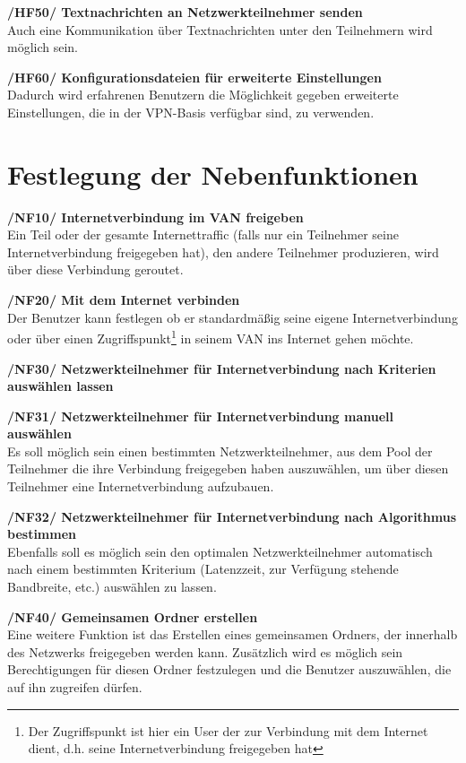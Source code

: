 \documentclass[a4paper,12pt]{scrreprt}
\begin{document}
		
		
		
		
		\textbf {/HF50/ Textnachrichten an Netzwerkteilnehmer senden}
		\\Auch eine Kommunikation über Textnachrichten unter den Teilnehmern wird möglich sein.
		
		 \textbf {/HF60/ Konfigurationsdateien für erweiterte Einstellungen}
		\\Dadurch wird erfahrenen Benutzern die Möglichkeit gegeben erweiterte Einstellungen, die in der VPN-Basis verfügbar sind, zu verwenden.
		
	\section{Festlegung der Nebenfunktionen}
	\textbf { /NF10/ Internetverbindung im VAN freigeben} 
	\\Ein Teil oder der gesamte Internettraffic (falls nur ein Teilnehmer seine Internetverbindung freigegeben hat), den andere Teilnehmer produzieren, wird über diese Verbindung geroutet.
			
	\textbf {/NF20/ Mit dem Internet verbinden} 
	\\Der Benutzer kann festlegen ob er standardmäßig seine eigene Internetverbindung oder über einen Zugriffspunkt\footnote{Der Zugriffspunkt ist hier ein User der zur Verbindung mit dem Internet dient, d.h. seine Internetverbindung freigegeben hat} in seinem VAN ins Internet gehen möchte.
	
	\textbf {/NF30/ Netzwerkteilnehmer für Internetverbindung nach Kriterien auswählen lassen}
	
	\textbf {/NF31/ Netzwerkteilnehmer für Internetverbindung manuell auswählen}
	\\Es soll möglich sein einen bestimmten Netzwerkteilnehmer, aus dem Pool der Teilnehmer die ihre Verbindung freigegeben haben auszuwählen, um über diesen Teilnehmer eine Internetverbindung aufzubauen.
	
	\textbf {/NF32/ Netzwerkteilnehmer für Internetverbindung nach Algorithmus bestimmen}
	\\Ebenfalls soll es möglich sein den optimalen Netzwerkteilnehmer automatisch nach einem bestimmten Kriterium (Latenzzeit, zur Verfügung stehende Bandbreite, etc.) auswählen zu lassen.
	
	\textbf {/NF40/ Gemeinsamen Ordner erstellen}
	\\Eine weitere Funktion ist das Erstellen eines gemeinsamen Ordners, der innerhalb des Netzwerks freigegeben werden kann. Zusätzlich wird es möglich sein Berechtigungen für diesen Ordner festzulegen und die Benutzer auszuwählen, die auf ihn zugreifen dürfen.
	
\end{document}
